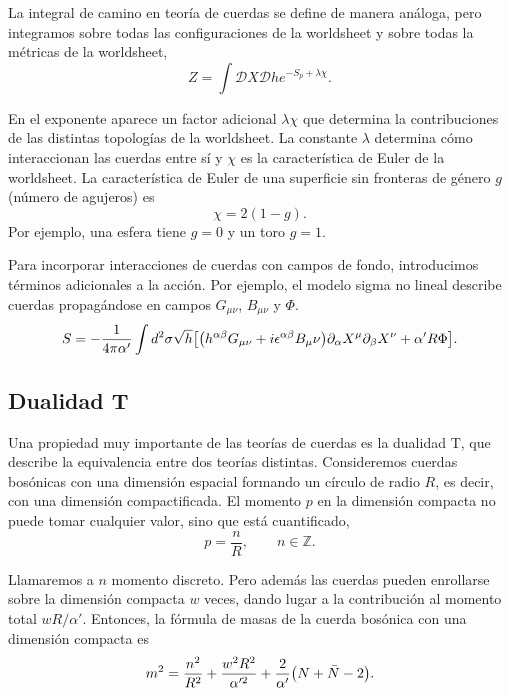 La integral de camino en teoría de cuerdas se define de manera análoga, pero integramos 
sobre todas las configuraciones  de la worldsheet y sobre todas la métricas de la worldsheet,
\begin{equation}
  Z = \int \mathcal DX \mathcal Dh e^{-S_p+\lambda \chi}.
\end{equation}

En el exponente aparece un factor adicional $\lambda\chi$ que determina la
contribuciones de las distintas topologías de la worldsheet.
La constante $\lambda$ determina cómo interaccionan las cuerdas entre sí y $\chi$ es la característica
de Euler de la worldsheet.
La característica de Euler de una superficie sin fronteras de género $g$ (número de agujeros) es
\begin{equation}
  \chi = 2(1-g).
\end{equation}
Por ejemplo, una esfera tiene $g=0$ y un toro $g=1$.

Para incorporar interacciones de cuerdas con campos de fondo, introducimos términos adicionales a la acción.
Por ejemplo, el modelo sigma no lineal describe cuerdas propagándose en campos $G_{\mu\nu}$, $B_{\mu\nu}$ y $\Phi$.
\begin{equation}
  S = -\frac{1}{4\pi \alpha'}\int d^2 \sigma \sqrt h \qty[\qty(h^{\alpha\beta}G_{\mu\nu} + i\epsilon^{\alpha\beta}B_\mu\nu)\partial_\alpha X^\mu
  \partial_\beta X^\nu +\alpha'R\Phi].
\end{equation}

\subsection{Dualidad T}
\label{sec:dual}
Una propiedad muy importante de las teorías de cuerdas es la dualidad T,
que describe la equivalencia entre dos teorías distintas.
Consideremos cuerdas bosónicas con una dimensión espacial formando un círculo de radio $R$,
es decir, con una dimensión compactificada.
El momento $p$ en la dimensión compacta no puede tomar cualquier valor, sino que está cuantificado,
\begin{equation}
  p = \frac{n}{R}, \qquad n \in \mathbb Z.
\end{equation}

Llamaremos a $n$ momento discreto.
Pero además las cuerdas pueden enrollarse sobre la dimensión compacta $w$ veces, dando lugar
a la contribución al momento total $wR/\alpha'$.
Entonces, la fórmula de masas de la cuerda bosónica con una dimensión compacta es
\begin{equation}
  m^2 = \frac{n^2}{R^2} + \frac{w^2 R^2}{\alpha'^2} +\frac{2}{\alpha'}\qty(N+\bar N -2).
\end{equation}


